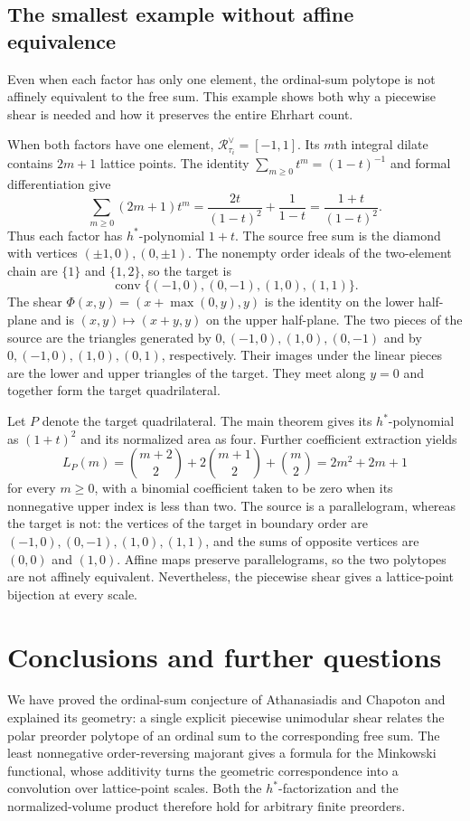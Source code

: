 \documentclass[11pt,reqno]{amsart}
\numberwithin{equation}{section}
\theoremstyle{definition}
\theoremstyle{remark}
\theoremstyle{definition}
\newcommand{\Rpoly}[1]{\mathcal R_{#1}^{\vee}}
\DeclareMathOperator{\conv}{conv}
\begin{document}
\subsection{The smallest example without affine equivalence}
Even when each factor has only one element, the ordinal-sum polytope is not affinely equivalent to the free sum. This example shows both why a piecewise shear is needed and how it preserves the entire Ehrhart count.

When both factors have one element, $\Rpoly{\tau_i}=[-1,1]$. Its $m$th integral dilate contains $2m+1$ lattice points. The identity
$\sum_{m\ge0}t^m=(1-t)^{-1}$ and formal differentiation give
\[
\sum_{m\ge0}(2m+1)t^m
 =\frac{2t}{(1-t)^2}+\frac1{1-t}
 =\frac{1+t}{(1-t)^2}.
\]
Thus each factor has $h^*$-polynomial $1+t$. The source free sum is the diamond with vertices $(\pm1,0),(0,\pm1)$. The nonempty order ideals of the two-element chain are $\{1\}$ and $\{1,2\}$, so the target is
\[
\conv\{(-1,0),(0,-1),(1,0),(1,1)\}.
\]
The shear $\Phi(x,y)=(x+\max(0,y),y)$ is the identity on the lower half-plane and is $(x,y)\mapsto(x+y,y)$ on the upper half-plane. The two pieces of the source are the triangles generated by $0,(-1,0),(1,0),(0,-1)$ and by $0,(-1,0),(1,0),(0,1)$, respectively. Their images under the linear pieces are the lower and upper triangles of the target. They meet along $y=0$ and together form the target quadrilateral.

Let $P$ denote the target quadrilateral. The main theorem gives its $h^*$-polynomial as $(1+t)^2$ and its normalized area as four. Further coefficient extraction yields
\[
L_P(m)=\binom{m+2}{2}+2\binom{m+1}{2}+\binom m2=2m^2+2m+1
\]
for every $m\ge0$, with a binomial coefficient taken to be zero when its nonnegative upper index is less than two. The source is a parallelogram, whereas the target is not: the vertices of the target in boundary order are $(-1,0),(0,-1),(1,0),(1,1)$, and the sums of opposite vertices are $(0,0)$ and $(1,0)$. Affine maps preserve parallelograms, so the two polytopes are not affinely equivalent. Nevertheless, the piecewise shear gives a lattice-point bijection at every scale.



\section{Conclusions and further questions}\label{sec:discussion}
We have proved the ordinal-sum conjecture of Athanasiadis and Chapoton and explained its geometry: a single explicit piecewise unimodular shear relates the polar preorder polytope of an ordinal sum to the corresponding free sum. The least nonnegative order-reversing majorant gives a formula for the Minkowski functional, whose additivity turns the geometric correspondence into a convolution over lattice-point scales. Both the $h^*$-factorization and the normalized-volume product therefore hold for arbitrary finite preorders.
\end{document}
